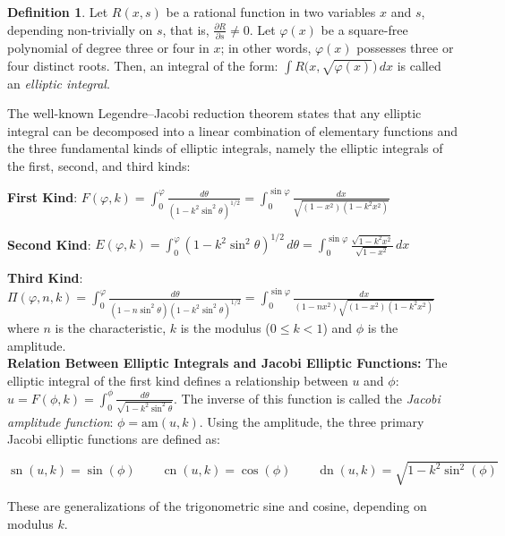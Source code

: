 \documentclass[12pt]{article}
\theoremstyle{plain}
\theoremstyle{definition}
\newtheorem{definition}[theorem]{Definition}
\theoremstyle{remark}
\begin{document}
   \begin{definition}
   	Let \( R(x, s) \) be a rational function in two variables \( x \) and \( s \), depending non-trivially on \( s \), that is, \(\frac{\partial R}{\partial s} \neq 0.\)  Let \( \varphi(x) \) be a square-free polynomial of degree three or four in \( x \); in other words, \( \varphi(x) \) possesses three or four distinct roots. Then, an integral of the form: \(\int R\bigl(x, \sqrt{\varphi(x)}\bigr)\, dx\) is called an \textit{elliptic integral}.
   \end{definition}
   
   The well-known Legendre--Jacobi reduction theorem states that any elliptic integral can be decomposed into a linear combination of elementary functions and the three fundamental kinds of elliptic integrals, namely the elliptic integrals of the first, second, and third kinds:
   
   \textbf{First Kind}: $F(\varphi, k) = \int_{0}^{\varphi} \frac{d\theta}{(1 - k^2 \sin^2 \theta)^{1/2}}
   = \int_{0}^{\sin \varphi} \frac{dx}{\sqrt{(1 - x^2)(1 - k^2 x^2)}}$
   
   \textbf{Second Kind}: $E(\varphi, k) = \int_{0}^{\varphi} (1 - k^2 \sin^2 \theta)^{1/2} \, d\theta
   = \int_{0}^{\sin \varphi} \frac{\sqrt{1 - k^2 x^2}}{\sqrt{1 - x^2}} \, dx$
   
   \textbf{Third Kind}: $\Pi(\varphi, n, k) = \int_{0}^{\varphi} \frac{d\theta}{(1 - n \sin^2 \theta)(1 - k^2 \sin^2 \theta)^{1/2}}
   = \int_{0}^{\sin \varphi} \frac{dx}{(1 - n x^2)\sqrt{(1 - x^2)(1 - k^2 x^2)}}$ where $n$ is the characteristic, $k$ is the modulus ($0 \leq k < 1$) and $\phi$ is the amplitude.\\
   
   \noindent
   \textbf{Relation Between Elliptic Integrals and Jacobi Elliptic Functions:}	The elliptic integral of the first kind defines a relationship between $u$ and $\phi$: \(u = F(\phi, k) = \int_0^{\phi} \tfrac{d\theta}{\sqrt{1 - k^2 \sin^2\theta}}.\)	The inverse of this function is called the \textit{Jacobi amplitude function}: \(\phi = \text{am}(u, k).\) Using the amplitude, the three primary Jacobi elliptic functions are defined as:
   
   \(
   \operatorname{sn}(u, k) = \sin(\phi) \qquad \operatorname{cn}(u, k) = \cos(\phi) \qquad \operatorname{dn}(u, k) = \sqrt{1 - k^2 \sin^2(\phi)}
   \)
   
   \noindent
   These are generalizations of the trigonometric sine and cosine, depending on modulus \(k\).
   
\end{document}
